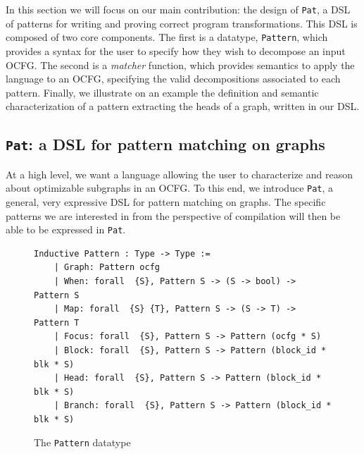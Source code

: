 \documentclass[11pt]{article}
\newcommand{\inlinecoq}[1]{\mbox{\lstinline[style=customcoq,columns=fixed,basewidth=.48em]{#1}}}
\newcommand{\ilc}[1]{\inlinecoq{#1}}
\newcommand{\cut}[1]{\textcolor{Gray!40}{#1}}
\newcommand{\ocfg}{OCFG\xspace}
\newcommand{\pat}{\texttt{Pat}\xspace}
\begin{document}
In this section we will focus on our main contribution: the design of \pat{}, a DSL of patterns for writing and proving correct program transformations. This DSL is composed of two core components. The first is a datatype, \ilc{Pattern}, which provides a syntax for the user to specify how they wish to decompose an input \ocfg. The second is a \emph{matcher} function, which provides semantics to apply the language to an \ocfg{}, specifying the valid decompositions associated to each pattern. Finally, we illustrate on an example the definition and semantic characterization of a pattern extracting the heads of a graph, written in our DSL\@.


\subsection{\pat: a DSL for pattern matching on graphs}

At a high level, we want a language allowing the user to characterize and reason about optimizable subgraphs in an \ocfg. To this end, we introduce \pat, a general, very expressive DSL for pattern matching on graphs. The specific patterns we are interested in from the perspective of compilation will then be able to be expressed in \pat.

\begin{figure}
  \begin{lstlisting}[style=customcoq,basicstyle=\small\ttfamily]
    Inductive Pattern : Type -> Type :=
    | Graph: Pattern ocfg
    | When: forall  {S}, Pattern S -> (S -> bool) -> Pattern S
    | Map: forall  {S} {T}, Pattern S -> (S -> T) -> Pattern T
    | Focus: forall  {S}, Pattern S -> Pattern (ocfg * S)
    | Block: forall  {S}, Pattern S -> Pattern (block_id * blk * S)
    | Head: forall  {S}, Pattern S -> Pattern (block_id * blk * S)
    | Branch: forall  {S}, Pattern S -> Pattern (block_id * blk * S)
  \end{lstlisting}
  \caption{The \ilc{Pattern} datatype}
  \label{fig:pat}
\end{figure}
\end{document}
